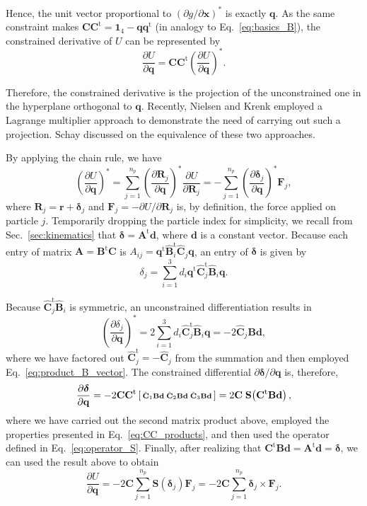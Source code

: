 \documentclass[aip,jcp,reprint,amsmath,amssymb]{revtex4-1}
\makeatletter
\newcommand{\mt}[1]{\boldsymbol{\mathbf{#1}}}           %
\newcommand{\vt}[1]{\boldsymbol{\mathbf{#1}}}           %
\newcommand{\tr}[1]{#1^\text{t}}                        %
\newcommand{\diff}[2]{\dfrac{\partial #1}{\partial #2}} %
\newenvironment{smallarray}[1]                          %
{\null\,\vcenter\bgroup\scriptsize
	\renewcommand{\arraystretch}{0.7}
	\arraycolsep=.13885em
	\hbox\bgroup$\array{@{}#1@{}}}
{\endarray$\egroup\egroup\,\null}
\makeatother
\begin{document}
Hence, the unit vector proportional to $(\partial g/\partial \vt x)^\ast$ is exactly $\vt q$. As the same constraint makes ${\mt C}\tr{\mt C} = \mt 1_4 - \vt q\tr{\vt q}$ (in analogy to Eq.~\ref{eq:basics_B}), the constrained derivative of $U$ can be represented by
\begin{equation}
\label{eq:diff_projection}
\diff{U}{\vt q} = {\mt C}\tr{\mt C} \left( \diff{U}{\vt q} \right)^\ast.
\end{equation}

Therefore, the constrained derivative is the projection of the unconstrained one in the hyperplane orthogonal to $\vt q$. Recently, Nielsen and Krenk\cite{Nielsen2012} employed a Lagrange multiplier approach to demonstrate the need of carrying out such a projection. Schay\cite{Schay1995, Schay1998} discussed on the equivalence of these two approaches.

By applying the chain rule, we have
\[
\left( \diff{U}{\vt q} \right)^\ast = \sum_{j=1}^{n_p} \left( \diff{\vt R_j}{\vt q} \right)^\ast \diff{U}{\vt R_j} = - \sum_{j=1}^{n_p} \left( \diff{\vt \delta_j}{\vt q} \right)^\ast {\vt F_j},
\]
where $\vt R_j = \vt r + \vt \delta_j$ and $\vt F_j = -\partial U/\partial \vt R_j$ is, by definition, the force applied on particle $j$. Temporarily dropping the particle index for simplicity, we recall from Sec.~\ref{sec:kinematics} that $\vt \delta = \tr{\mt A}\vt d$, where $\vt d$ is a constant vector. Because each entry of matrix $\mt A = \tr{\mt B}{\mt C}$ is $A_{ij}=\tr{\vt q} \tr{\hat{\mt B}}_i \hat{\mt C}_j {\vt q}$, an entry of $\vt \delta$ is given by
\[
\delta_j = \sum_{i=1}^{3} d_i \tr{\vt q} \tr{\hat{\mt C}}_j \hat{\mt B}_i {\vt q}.
\]

Because $\tr{\hat{\mt C}}_j \hat{\mt B}_i$ is symmetric, an unconstrained differentiation results in
\[
\left(\diff{\delta_j}{\vt q}\right)^\ast = 2 \sum_{i=1}^{3} d_i \tr{\hat{\mt C}}_j \hat{\mt B}_i {\vt q} = -2{\hat{\mt C}}_j {\mt B}{\vt d},
\]
where we have factored out $\tr{\hat{\mt C}}_j = -\hat{\mt C}_j$ from the summation and then employed Eq.~\ref{eq:product_B_vector}. The constrained differential $\partial \vt \delta/\partial \vt q$ is, therefore,
\[
\diff{\vt \delta}{\vt q} = -2{\mt C}\tr{\mt C}
\left[\begin{smallarray}{ccc}
{\hat{\mt C}}_1 {\mt B}{\vt d} & {\hat{\mt C}}_2 {\mt B}{\vt d} & {\hat{\mt C}}_3 {\mt B}{\vt d}
\end{smallarray}\right] = 2{\mt C}\;{\mt S}\!\left(\tr{\mt C}{\mt B}\vt d\right),
\]
where we have carried out the second matrix product above, employed the properties presented in Eq.~\ref{eq:CC_products}, and then used the operator defined in Eq.~\ref{eq:operator_S}. Finally, after realizing that $\tr{\mt C}{\mt B}\vt d = \tr{\mt A}{\vt d} = \vt \delta$, we can used the result above to obtain
\[
\diff{U}{\vt q} = - 2 \mt C \sum_{j=1}^{n_p} \mt S(\vt \delta_j) {\vt F_j}  = - 2 \mt C \sum_{j=1}^{n_p} \vt \delta_j \times {\vt F_j}.
\]


\end{document}
